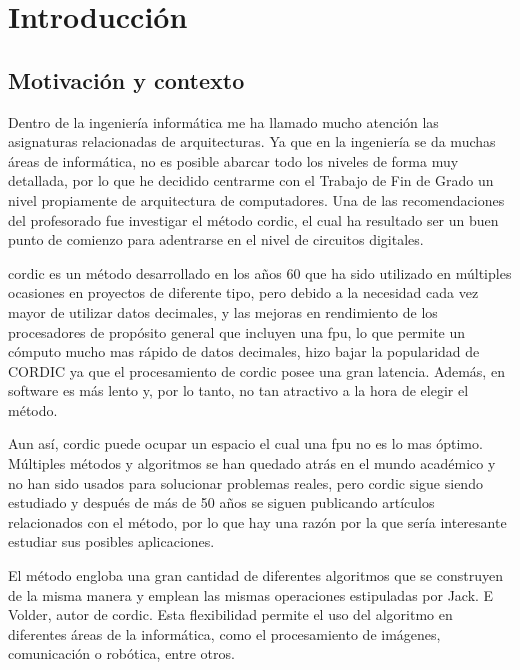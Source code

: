 
\chapter{Introducción}
\section{Motivación y contexto}
\label{motivacion}

Dentro de la ingeniería informática me ha llamado mucho atención las asignaturas relacionadas de arquitecturas. Ya que en la ingeniería se da muchas áreas de informática, no es posible abarcar todo los niveles de forma muy detallada, por lo que he decidido centrarme con el Trabajo de Fin de Grado un nivel propiamente de arquitectura de computadores. Una de las recomendaciones del profesorado fue investigar el método \gls{cordic}, el cual ha resultado ser un buen punto de comienzo para adentrarse en el nivel de circuitos digitales.

\gls{cordic} es un método desarrollado en los años 60 que ha sido utilizado en múltiples ocasiones en proyectos de diferente tipo, pero debido a la necesidad cada vez mayor de utilizar datos decimales, y las mejoras en rendimiento de los procesadores de propósito general que incluyen una \gls{fpu}, lo que permite un cómputo mucho mas rápido de datos decimales, hizo bajar la popularidad de CORDIC ya que el procesamiento de \gls{cordic} posee una gran latencia. Además, en software es más lento y, por lo tanto, no tan atractivo a la hora de elegir el método.

Aun así, \gls{cordic} puede ocupar un espacio el cual una \gls{fpu} no es lo mas óptimo. Múltiples métodos y algoritmos se han quedado atrás en el mundo académico y no han sido usados para solucionar problemas reales, pero \gls{cordic} sigue siendo estudiado y después de más de 50 años se siguen publicando artículos relacionados con el método, por lo que hay una razón por la que sería interesante estudiar sus posibles aplicaciones.

El método engloba una gran cantidad de diferentes algoritmos que se construyen de la misma manera y emplean las mismas operaciones estipuladas por Jack. E Volder, autor de \gls{cordic}. Esta flexibilidad permite el uso del algoritmo en diferentes áreas de la informática, como el procesamiento de imágenes, comunicación o robótica, entre otros.

